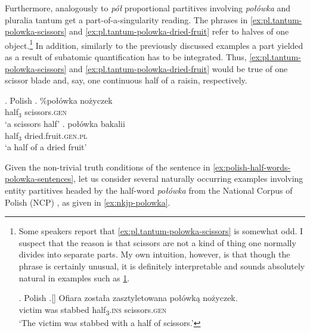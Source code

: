 Furthermore, analogously to \textit{pół} proportional partitives involving \textit{połówka} and pluralia tantum get a part-of-a-singularity reading. The phrases in \ref{ex:pl.tantum-polowka-scissors} and \ref{ex:pl.tantum-polowka-dried-fruit} refer to halves of one object.\footnote{Some speakers report that \ref{ex:pl.tantum-polowka-scissors} is somewhat odd. I suspect that the reason is that scissors are not a kind of thing one normally divides into separate parts. My own intuition, however, is that though the phrase is certainly unusual, it is definitely interpretable and sounds absolutely natural in examples such as \ref{ex:polish-polowka-scissors-stabbing}.

\ex. Polish
\bg.[] Ofiara została zasztyletowana połówką nożyczek.\\
victim was stabbed half\textsubscript{3}\textsc{.ins} scissors\textsc{.gen}\\
`The victim was stabbed with a half of scissors.'\label{ex:polish-polowka-scissors-stabbing}

} In addition, similarly to the previously discussed examples a part yielded as a result of subatomic quantification has to be integrated. Thus, \ref{ex:pl.tantum-polowka-scissors} and \ref{ex:pl.tantum-polowka-dried-fruit} would be true of one scissor blade and, say, one continuous half of a raisin, respectively.\largerpage[2]

	\ex.\label{ex:pl.tantum-polowka} Polish
    \ag. \%połówka nożyczek\label{ex:pl.tantum-polowka-scissors}\\ 
	half$_3$ scissors\textsc{.gen}\\
	`a scissors half'
	\bg. połówka bakalii\label{ex:pl.tantum-polowka-dried-fruit}\\ 
	half$_3$ dried.fruit\textsc{.gen.pl}\\
	`a half of a dried fruit'

Given the non-trivial truth conditions of the sentence in \ref{ex:polish-half-words-polowka-sentences}, let us consider several naturally occurring examples involving entity partitives headed by the half-word \textit{połówka} from the National Corpus of Polish (NCP) \citep{przepiorkowski_et-al2012narodowy}, as given in \ref{ex:nkjp-polowka}.

